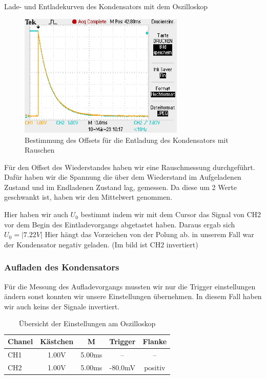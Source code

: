 \documentclass[twoside]{protokoll}
\begin{document}
\begin{aufgabe}{Lade- und Entladekurven des Kondensators mit dem Oszilloskop}
\begin{figure}[H]
     
  \centering
    \includegraphics[width=0.7\textwidth]{Bilder_Osziloskop/Entladen_Wiederstand_Offset.pdf}
    \caption{Bestimmung des Offsets für die Entladung des Kondensators mit Rauschen}
  \centering
\end{figure}

Für den Offset des Wiederstandes haben wir eine Rauschmessung durchgeführt.
Dafür haben wir die Spannung die über dem Wiederstand im Aufgeladenen Zustand  und im Endladenen Zustand lag, gemessen.
Da diese um 2 Werte geschwankt ist, haben wir den Mittelwert genommen.

Hier haben wir auch $U_0$ bestimmt indem wir mit dem Cursor das Signal von CH2 vor dem Begin des Eintladevorgangs abgetastet haben. Daraus ergab sich $U_0 = |7.22V|$ Hier hängt das Vorzeichen von der Polung ab. in unserem Fall war der Kondensator negativ geladen. (Im bild ist CH2 invertiert)

 \subsubsection{Aufladen des Kondensators}
 
 
Für die Messung des Aufladevorgangs mussten wir nur die Trigger einstellungen ändern sonst konnten wir unsere Einstellungen übernehmen. In diesem Fall haben wir auch keins der Signale invertiert. 

\begin{table}[H]
        \centering
        \begin{tabularx}{0.8\textwidth}{X c c c c} %
            \toprule
            \textbf{Chanel} & \textbf{Kästchen} & \textbf{M} & \textbf{Trigger} & \textbf{Flanke} \\
            \midrule
            CH1 & 1.00V & 5.00ms & -- & -- \\
            CH2 & 1.00V & 5.00ms & -80.0mV & positiv \\
            \bottomrule
        \end{tabularx}
        \caption{Übersicht der Einstellungen am Oszilloskop}
        \label{tab:mytable}
    \end{table}
    

\end{aufgabe}
\end{document}
